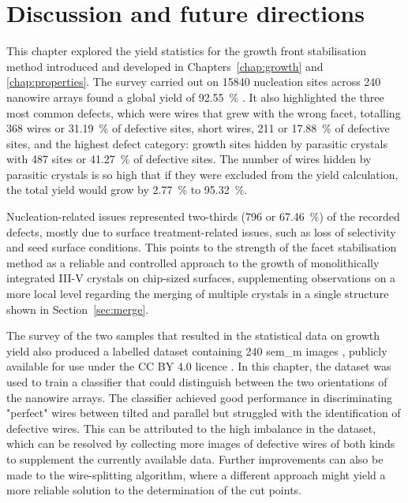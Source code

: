 \section{Discussion and future directions}

This chapter explored the yield statistics for the  growth front stabilisation method introduced and developed in Chapters~\ref{chap:growth} and \ref{chap:properties}. The survey carried out on \num{15840} nucleation sites across \num{240} nanowire arrays found a global yield of \qty{92.55}{\%} \cite{Brugnolotto2023_2}. It also highlighted the three most common defects, which were wires that grew with the wrong facet, totalling \num{368} wires or \qty{31.19}{\%} of defective sites, short wires, \num{211} or \qty{17.88}{\%} of defective sites, and the highest defect category: growth sites hidden by parasitic crystals with \num{487} sites or \qty{41.27}{\%} of defective sites. The number of wires hidden by parasitic crystals is so high that if they were excluded from the yield calculation, the total yield would grow by \qty{2.77}{\%} to \qty{95.32}{\%}.

Nucleation-related issues represented two-thirds (\num{796} or \qty{67.46}{\%}) of the recorded defects, mostly due to surface treatment-related issues, such as loss of selectivity and seed surface conditions. This points to the strength of the facet stabilisation method as a reliable and controlled approach to the growth of monolithically integrated III-V crystals on chip-sized surfaces, supplementing observations on a more local level regarding the merging of multiple crystals in a single structure shown in Section~\ref{sec:merge}.

The survey of the two samples that resulted in the statistical data on growth yield also produced a labelled dataset containing \num{240} \acs{sem_m} images \cite{dataset}, publicly available for use under the CC BY 4.0 licence \cite{CCBY40}. In this chapter, the dataset was used to train a classifier that could distinguish between the two orientations of the nanowire arrays. The classifier achieved good performance in discriminating "perfect" wires between tilted and parallel but struggled with the identification of defective wires. This can be attributed to the high imbalance in the dataset, which can be resolved by collecting more images of defective wires of both kinds to supplement the currently available data. Further improvements can also be made to the wire-splitting algorithm, where a different approach might yield a more reliable solution to the determination of the cut points.